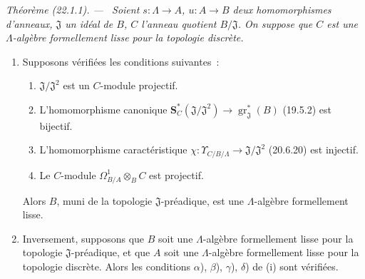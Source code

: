 \documentclass[10pt,oneside]{book}
\makeatletter
\newcommand{\setmanualcurrentlabel}[1]{\def\@currentlabel{#1}}
\newenvironment{theorem}[1][]{%
  \setmanualcurrentlabel{#1}\par\medskip\noindent\itshape Théorème (#1). ---\ }{\par}
\makeatother
\begin{document}
\begin{theorem}[22.1.1]
\label{0.22.1.1-fr}
Soient $s:\Lambda\to A$, $u:A\to B$ deux homomorphismes d'anneaux,
$\mathfrak J$ un idéal de $B$, $C$ l'anneau quotient $B/\mathfrak J$. On
suppose que $C$ est une $\Lambda$-algèbre formellement lisse pour la topologie
discrète.
\begin{enumerate}
  \item[(i)] Supposons vérifiées les conditions suivantes~:
  \begin{enumerate}
    \item[$\alpha$)] $\mathfrak J/\mathfrak J^2$ est un $C$-module projectif.
    \item[$\beta$)] L'homomorphisme canonique
    $\mathbf S_C^*(\mathfrak J/\mathfrak J^2)\to
    \operatorname{gr}_{\mathfrak J}^*(B)$ (19.5.2) est bijectif.
    \item[$\gamma$)] L'homomorphisme caractéristique
    $\chi:\Upsilon_{C/B/\Lambda}\to\mathfrak J/\mathfrak J^2$ (20.6.20)
    est injectif.
    \item[$\delta$)] Le $C$-module
    $\Omega^1_{B/A}\otimes_BC$ est projectif.
  \end{enumerate}
  Alors $B$, muni de la topologie $\mathfrak J$-préadique, est une
  $\Lambda$-algèbre formellement lisse.

  \item[(ii)] Inversement, supposons que $B$ soit une $\Lambda$-algèbre
  formellement lisse pour la topologie $\mathfrak J$-préadique, et que $A$
  soit une $\Lambda$-algèbre formellement lisse pour la topologie discrète.
  Alors les conditions $\alpha$), $\beta$), $\gamma$), $\delta$) de (i) sont
  vérifiées.
\end{enumerate}
\end{theorem}
\end{document}
